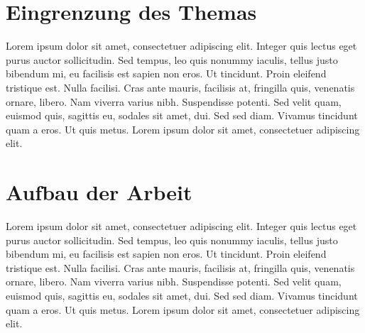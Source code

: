 \section{Eingrenzung des Themas}
\label{ch:eingrenzungThema}
Lorem ipsum dolor sit amet, consectetuer adipiscing elit. Integer quis lectus eget purus auctor sollicitudin. Sed tempus, leo quis nonummy
iaculis, tellus justo bibendum mi, eu facilisis est sapien non eros. Ut tincidunt. Proin eleifend tristique est. Nulla facilisi. Cras ante
mauris, facilisis at, fringilla quis, venenatis ornare, libero. Nam viverra varius nibh. Suspendisse potenti. Sed velit quam, euismod quis,
sagittis eu, sodales sit amet, dui. Sed sed diam. Vivamus tincidunt quam a eros. Ut quis metus. Lorem ipsum dolor sit amet, consectetuer adipiscing elit.

\section{Aufbau der Arbeit}
Lorem ipsum dolor sit amet, consectetuer adipiscing elit. Integer quis lectus eget purus auctor sollicitudin. Sed tempus, leo quis nonummy
iaculis, tellus justo bibendum mi, eu facilisis est sapien non eros. Ut tincidunt. Proin eleifend tristique est. Nulla facilisi. Cras ante
mauris, facilisis at, fringilla quis, venenatis ornare, libero. Nam viverra varius nibh. Suspendisse potenti. Sed velit quam, euismod quis,
sagittis eu, sodales sit amet, dui. Sed sed diam. Vivamus tincidunt quam a eros. Ut quis metus. Lorem ipsum dolor sit amet, consectetuer adipiscing elit.
